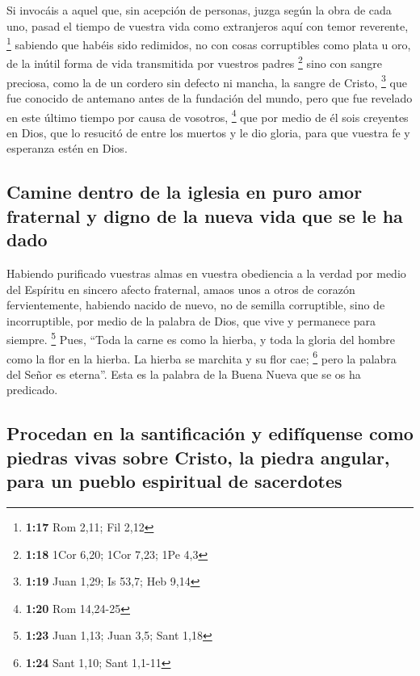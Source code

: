  Si invocáis a aquel que, sin acepción de personas, juzga
según la obra de cada uno, pasad el tiempo de vuestra vida como
extranjeros aquí con temor reverente, \footnote{\textbf{1:17} Rom 2,11;
  Fil 2,12}  sabiendo que habéis sido redimidos, no con
cosas corruptibles como plata u oro, de la inútil forma de vida
transmitida por vuestros padres \footnote{\textbf{1:18} 1Cor 6,20; 1Cor
  7,23; 1Pe 4,3}  sino con sangre preciosa, como la de un
cordero sin defecto ni mancha, la sangre de Cristo, \footnote{\textbf{1:19}
  Juan 1,29; Is 53,7; Heb 9,14}  que fue conocido de
antemano antes de la fundación del mundo, pero que fue revelado en este
último tiempo por causa de vosotros, \footnote{\textbf{1:20} Rom
  14,24-25}  que por medio de él sois creyentes en Dios,
que lo resucitó de entre los muertos y le dio gloria, para que vuestra
fe y esperanza estén en Dios.

\hypertarget{camine-dentro-de-la-iglesia-en-puro-amor-fraternal-y-digno-de-la-nueva-vida-que-se-le-ha-dado}{%
\subsection{Camine dentro de la iglesia en puro amor fraternal y digno
de la nueva vida que se le ha
dado}\label{camine-dentro-de-la-iglesia-en-puro-amor-fraternal-y-digno-de-la-nueva-vida-que-se-le-ha-dado}}

 Habiendo purificado vuestras almas en vuestra obediencia
a la verdad por medio del Espíritu en sincero afecto fraternal, amaos
unos a otros de corazón fervientemente,  habiendo nacido
de nuevo, no de semilla corruptible, sino de incorruptible, por medio de
la palabra de Dios, que vive y permanece para siempre. \footnote{\textbf{1:23}
  Juan 1,13; Juan 3,5; Sant 1,18}  Pues, ``Toda la carne
es como la hierba, y toda la gloria del hombre como la flor en la
hierba. La hierba se marchita y su flor cae; \footnote{\textbf{1:24}
  Sant 1,10; Sant 1,1-11}  pero la palabra del Señor es
eterna''. Esta es la palabra de la Buena Nueva que se os ha predicado.

\hypertarget{procedan-en-la-santificaciuxf3n-y-edifuxedquense-como-piedras-vivas-sobre-cristo-la-piedra-angular-para-un-pueblo-espiritual-de-sacerdotes}{%
\subsection{Procedan en la santificación y edifíquense como piedras
vivas sobre Cristo, la piedra angular, para un pueblo espiritual de
sacerdotes}\label{procedan-en-la-santificaciuxf3n-y-edifuxedquense-como-piedras-vivas-sobre-cristo-la-piedra-angular-para-un-pueblo-espiritual-de-sacerdotes}}

